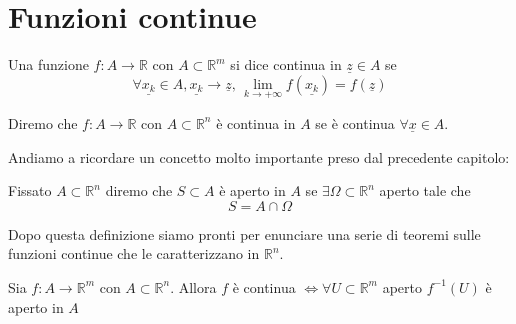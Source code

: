 \section{Funzioni continue}
\begin{definition}
Una funzione $f: A \to \mathbb{R}$ con $A \subset \mathbb{R}^m$ si dice continua in $\underline{z} \in A$ se $$\forall \underline{x_k} \in A, \underline{x_k} \to \underline{z}, \, \lim\limits_{k \to +\infty} f(\underline{x_k}) = f(\underline{z})$$
\end{definition}
\begin{remark}
Diremo che $f: A \to \mathbb{R}$ con $A \subset \mathbb{R}^n$ è continua in $A$ se è continua $\forall \underline{x} \in A$.
\end{remark}
\noindent Andiamo a ricordare un concetto molto importante preso dal precedente capitolo:
\begin{definition}
Fissato $A \subset \mathbb{R}^n$ diremo che $S \subset A$ è aperto in $A$ se $\exists \Omega \subset \mathbb{R}^n$ aperto tale che $$S = A \cap \Omega$$
\end{definition}
Dopo questa definizione siamo pronti per enunciare una serie di teoremi sulle funzioni continue che le caratterizzano in $\mathbb{R}^n$.
\begin{theorem}[teorema C1]
Sia $f: A \to \mathbb{R}^m$ con $A \subset \mathbb{R}^n$. Allora $f$ è continua $\iff \forall U \subset \mathbb{R}^m$ aperto $f^{-1}(U)$ è aperto in $A$
\label{thm:theo_c1}
\end{theorem}
